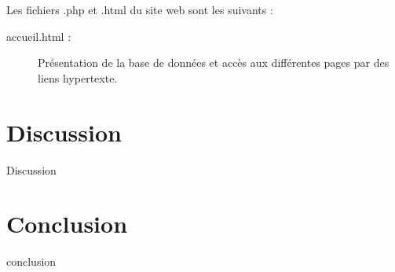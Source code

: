 \documentclass[12pt,a4paper,oneside]{article}
\begin{document}
Les fichiers .php et .html du site web sont les suivants :
\begin{description}
\item[accueil.html :] Présentation de la base de données et accès aux différentes pages par des liens hypertexte.

\end{description}

\section{Discussion}
Discussion
\section{Conclusion}
conclusion
\end{document}
